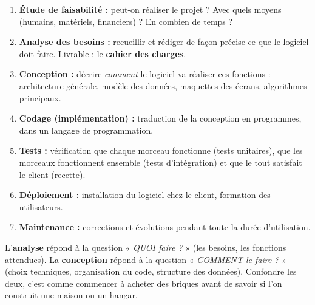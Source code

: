 \documentclass[11pt]{article}
\begin{document}
\begin{definition}
\begin{enumerate}
    \item \textbf{Étude de faisabilité :} peut-on réaliser le projet ? Avec quels moyens (humains, matériels, financiers) ? En combien de temps ?
    \item \textbf{Analyse des besoins :} recueillir et rédiger de façon précise ce que le logiciel doit faire. Livrable : le \textbf{cahier des charges}.
    \item \textbf{Conception :} décrire \emph{comment} le logiciel va réaliser ces fonctions : architecture générale, modèle des données, maquettes des écrans, algorithmes principaux.
    \item \textbf{Codage (implémentation) :} traduction de la conception en programmes, dans un langage de programmation.
    \item \textbf{Tests :} vérification que chaque morceau fonctionne (tests unitaires), que les morceaux fonctionnent ensemble (tests d'intégration) et que le tout satisfait le client (recette).
    \item \textbf{Déploiement :} installation du logiciel chez le client, formation des utilisateurs.
    \item \textbf{Maintenance :} corrections et évolutions pendant toute la durée d'utilisation.
\end{enumerate}
\end{definition}

\begin{attention}
L'\textbf{analyse} répond à la question « \emph{QUOI faire ?} » (les besoins, les fonctions attendues). La \textbf{conception} répond à la question « \emph{COMMENT le faire ?} » (choix techniques, organisation du code, structure des données). Confondre les deux, c'est comme commencer à acheter des briques avant de savoir si l'on construit une maison ou un hangar.
\end{attention}
\end{document}
